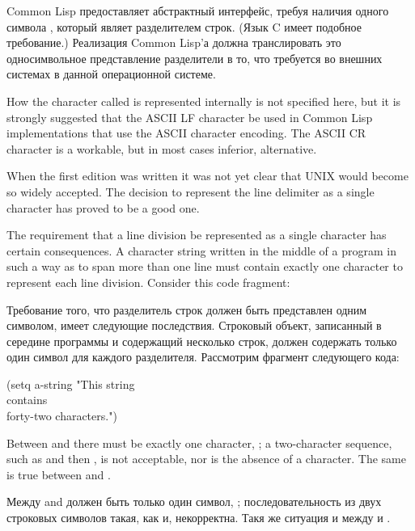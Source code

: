 Common Lisp предоставляет абстрактный интерфейс, требуя наличия одного символа
, который являет разделителем строк. (Язык C имеет
подобное требование.)
Реализация Common Lisp'а должна транслировать это односимвольное представление
разделители в то, что требуется во внешних системах в данной операционной системе.

\beforenoterule
\begin{implementation}
How the character called  is represented
internally is not specified here, but it is strongly suggested that
the ASCII LF character be used in Common Lisp implementations that use the
ASCII character encoding.  The ASCII CR character is a workable,
but in most cases inferior, alternative.
\end{implementation}
\afternoterule

\begin{newer}
When the first edition was written it was not yet clear that UNIX would
become so widely accepted.  The decision to represent
the line delimiter as a single character has proved to be a good one.
\end{newer}

The requirement that a line division be represented as a single character
has certain consequences.  A character string
written in the middle of a program in such a way as to span more than
one line must contain exactly one character to represent each line division.
Consider this code fragment:

Требование того, что разделитель строк должен быть представлен одним символом,
имеет следующие последствия. Строковый объект, записанный в середине программы и
содержащий несколько строк, должен содержать только один символ для каждого
разделителя. Рассмотрим фрагмент следующего кода:
\begin{lisp}
(setq a-string "This string \\
contains \\
forty-two characters.")
\end{lisp}
Between  and  there must be exactly one character,
; a two-character sequence, such as  and then
, is not acceptable, nor is the absence of a character.
The same is true between  and .

Между  and  должен быть только один символ,
; последовательность из двух строковых символов
такая, как  и,
некорректна.
Такя же ситуация и между  и .

